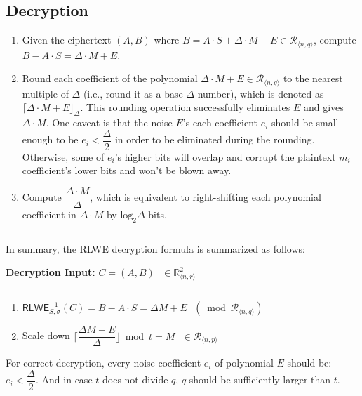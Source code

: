 \subsection{Decryption}
\label{subsec:rlwe-dec}

\begin{enumerate}
\item Given the ciphertext $(A, B)$ where $B = A \cdot S + \Delta \cdot M + E \in \mathcal{R}_{\langle n,q \rangle}$, compute $B - A \cdot S = \Delta \cdot M + E$. 
\item Round each coefficient of the polynomial $\Delta \cdot M + E \in \mathcal{R}_{\langle n,q \rangle}$ to the nearest multiple of $\Delta$ (i.e., round it as a base $\Delta$ number), which is denoted as $\lceil \Delta \cdot M + E \rfloor_{\Delta}$.  This rounding operation successfully eliminates $E$ and gives $\Delta \cdot M$. One caveat is that the noise $E$'s each coefficient $e_i$ should be small enough to be $e_i < \dfrac{\Delta}{2}$ in order to be eliminated during the rounding. Otherwise, some of $e_i$'s higher bits will overlap and corrupt the plaintext $m_i$ coefficient's lower bits and won't be blown away.
\item Compute $\dfrac{\Delta \cdot M}{\Delta}$, which is equivalent to right-shifting each polynomial coefficient in $\Delta \cdot M$ by $\text{log}_2 \Delta$ bits.
\end{enumerate}

$ $

In summary, the RLWE decryption formula is summarized as follows:


\begin{tcolorbox}[title={\textbf{\tboxlabel{\ref*{subsec:rlwe-dec}} RLWE Decryption}}]

\textbf{\underline{Decryption Input}:} $C = (A, B) \text{ } \in \mathbb{R}_{\langle n, r \rangle}^{2}$

$ $

\begin{enumerate}

\item $\textsf{RLWE}^{-1}_{S,\sigma}(C) = B - A \cdot S = \Delta  M + E \text{ } (\bmod \mathcal{R}_{\langle n,q \rangle})$ 
\item Scale down $\Bigg\lceil\dfrac{ \Delta M + E}{\Delta}\Bigg\rfloor \bmod t = M \text{ } \in \mathcal{R}_{\langle n,p \rangle}$

\end{enumerate}

For correct decryption, every noise coefficient $e_i$ of polynomial $E$ should be: $e_i < \dfrac{\Delta}{2}$. And in case $t$ does not divide $q$, $q$ should be sufficiently larger than $t$.

\end{tcolorbox}